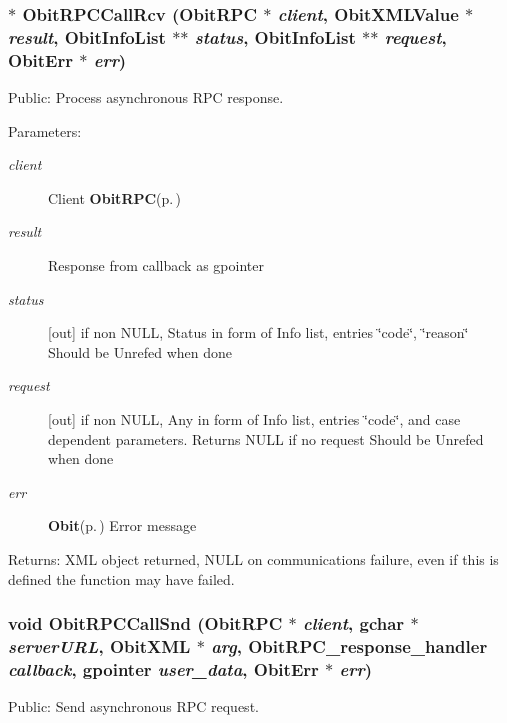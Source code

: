 \subsubsection{$\ast$ Obit\-RPCCall\-Rcv ({\bf Obit\-RPC} $\ast$ {\em client}, {\bf Obit\-XMLValue} $\ast$ {\em result}, {\bf Obit\-Info\-List} $\ast$$\ast$ {\em status}, {\bf Obit\-Info\-List} $\ast$$\ast$ {\em request}, {\bf Obit\-Err} $\ast$ {\em err})}\label{ObitRPC_8h_a22}


Public: Process asynchronous RPC response. 

\begin{Desc}
\item[Parameters:]
\begin{description}
\item[{\em client}]Client {\bf Obit\-RPC}{\rm (p.\,\pageref{structObitRPC})} \item[{\em result}]Response from callback as gpointer \item[{\em status}][out] if non NULL, Status in form of Info list, entries \char`\"{}code\char`\"{}, \char`\"{}reason\char`\"{} Should be Unrefed when done \item[{\em request}][out] if non NULL, Any in form of Info list, entries \char`\"{}code\char`\"{}, and case dependent parameters. Returns NULL if no request Should be Unrefed when done \item[{\em err}]{\bf Obit}{\rm (p.\,\pageref{structObit})} Error message \end{description}
\end{Desc}
\begin{Desc}
\item[Returns:]XML object returned, NULL on communications failure, even if this is defined the function may have failed. \end{Desc}
\subsubsection{\setlength{\rightskip}{0pt plus 5cm}void Obit\-RPCCall\-Snd ({\bf Obit\-RPC} $\ast$ {\em client}, gchar $\ast$ {\em server\-URL}, {\bf Obit\-XML} $\ast$ {\em arg}, {\bf Obit\-RPC\_\-response\_\-handler} {\em callback}, gpointer {\em user\_\-data}, {\bf Obit\-Err} $\ast$ {\em err})}\label{ObitRPC_8h_a21}


Public: Send asynchronous RPC request. 

